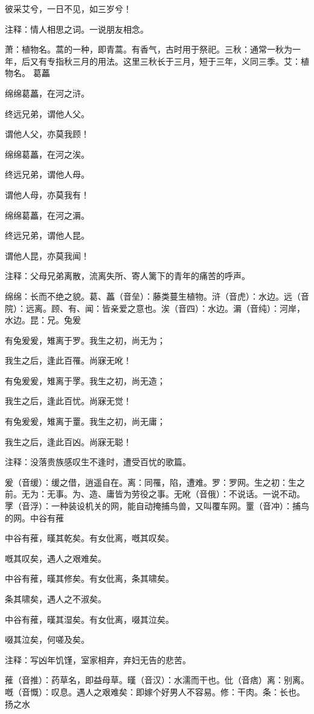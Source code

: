 \documentclass[12pt,UTF8]{ctexbook}
\begin{document}
彼采艾兮，一日不见，如三岁兮！

注释：情人相思之词。一说朋友相念。

萧：植物名。蒿的一种，即青蒿。有香气，古时用于祭祀。三秋：通常一秋为一年，后又有专指秋三月的用法。这里三秋长于三月，短于三年，义同三季。艾：植物名。 葛藟

绵绵葛藟，在河之浒。

终远兄弟，谓他人父。

谓他人父，亦莫我顾！

绵绵葛藟，在河之涘。

终远兄弟，谓他人母。

谓他人母，亦莫我有！

绵绵葛藟，在河之漘。

终远兄弟，谓他人昆。

谓他人昆，亦莫我闻！

注释：父母兄弟离散，流离失所、寄人篱下的青年的痛苦的呼声。

绵绵：长而不绝之貌。葛、藟（音垒）：藤类蔓生植物。浒（音虎）：水边。远（音院）：远离。顾、有、闻：皆亲爱之意也。涘（音四）：水边。漘（音纯）：河岸，水边。昆：兄。兔爰

有兔爰爰，雉离于罗。我生之初，尚无为；

我生之后，逢此百罹。尚寐无吪！

有兔爰爰，雉离于罦。我生之初，尚无造；

我生之后，逢此百忧。尚寐无觉！

有兔爰爰，雉离于罿。我生之初，尚无庸；

我生之后，逢此百凶。尚寐无聪！

注释：没落贵族感叹生不逢时，遭受百忧的歌篇。

爰（音缓）：缓之借，逍遥自在。离：同罹，陷，遭难。罗：罗网。生之初：生之前。无为：无事。为、造、庸皆为劳役之事。无吪（音俄）：不说话。一说不动。罦（音浮）：一种装设机关的网，能自动掩捕鸟兽，又叫覆车网。罿（音冲）：捕鸟的网。中谷有蓷

中谷有蓷，暵其乾矣。有女仳离，嘅其叹矣。

嘅其叹矣，遇人之艰难矣。

中谷有蓷，暵其修矣。有女仳离，条其啸矣。

条其啸矣，遇人之不淑矣。

中谷有蓷，暵其湿矣。有女仳离，啜其泣矣。

啜其泣矣，何嗟及矣。

注释：写凶年饥馑，室家相弃，弃妇无告的悲苦。

蓷（音推）：药草名，即益母草。暵（音汉）：水濡而干也。仳（音痞）离：别离。嘅（音慨）：叹息。遇人之艰难矣：即嫁个好男人不容易。修：干肉。条：长也。扬之水
\end{document}
